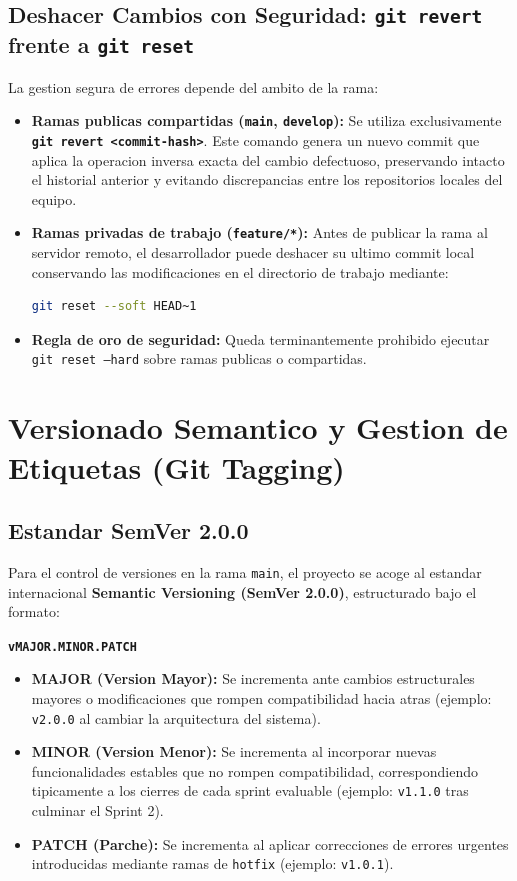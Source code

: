 \documentclass[12pt,a4paper]{report}
\begin{document}
\section{Deshacer Cambios con Seguridad: \texttt{git revert} frente a \texttt{git reset}}
La gestion segura de errores depende del ambito de la rama:

\begin{itemize}
  \item \textbf{Ramas publicas compartidas (\texttt{main}, \texttt{develop}):} Se utiliza exclusivamente \textbf{\texttt{git revert <commit-hash>}}. Este comando genera un nuevo commit que aplica la operacion inversa exacta del cambio defectuoso, preservando intacto el historial anterior y evitando discrepancias entre los repositorios locales del equipo.
  \item \textbf{Ramas privadas de trabajo (\texttt{feature/*}):} Antes de publicar la rama al servidor remoto, el desarrollador puede deshacer su ultimo commit local conservando las modificaciones en el directorio de trabajo mediante:
\begin{lstlisting}[language=bash]
git reset --soft HEAD~1
\end{lstlisting}
  \item \textbf{Regla de oro de seguridad:} Queda terminantemente prohibido ejecutar \texttt{git reset --hard} sobre ramas publicas o compartidas.
\end{itemize}

\newpage
\chapter{Versionado Semantico y Gestion de Etiquetas (Git Tagging)}

\section{Estandar SemVer 2.0.0}
Para el control de versiones en la rama \texttt{main}, el proyecto se acoge al estandar internacional \textbf{Semantic Versioning (SemVer 2.0.0)}, estructurado bajo el formato:
\begin{center}
  \textbf{\large \texttt{vMAJOR.MINOR.PATCH}}
\end{center}

\begin{itemize}
  \item \textbf{MAJOR (Version Mayor):} Se incrementa ante cambios estructurales mayores o modificaciones que rompen compatibilidad hacia atras (ejemplo: \texttt{v2.0.0} al cambiar la arquitectura del sistema).
  \item \textbf{MINOR (Version Menor):} Se incrementa al incorporar nuevas funcionalidades estables que no rompen compatibilidad, correspondiendo tipicamente a los cierres de cada sprint evaluable (ejemplo: \texttt{v1.1.0} tras culminar el Sprint 2).
  \item \textbf{PATCH (Parche):} Se incrementa al aplicar correcciones de errores urgentes introducidas mediante ramas de \texttt{hotfix} (ejemplo: \texttt{v1.0.1}).
\end{itemize}
\end{document}
